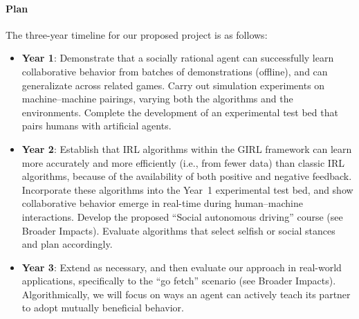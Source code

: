 
\vspace{\up}
\paragraph{Plan}

The three-year timeline for our proposed project is as follows:

\begin{itemize}
\item {\bf Year 1}: Demonstrate that a socially rational agent can
  successfully learn collaborative behavior from batches of
  demonstrations (offline), and can generalizate across related games.
  Carry out simulation experiments on machine--machine pairings,
  varying both the algorithms and the environments.  Complete the
  development of an experimental test bed that pairs humans with
  artificial agents.

\item {\bf Year 2}: Establish that IRL algorithms within the GIRL
  framework can learn more accurately and more efficiently (i.e., from
  fewer data) than classic IRL algorithms, because of the availability of
  both positive and negative feedback.
  Incorporate these algorithms into the Year~1 experimental
  test bed, and show collaborative behavior emerge in
  real-time during human--machine interactions.  Develop the proposed
  ``Social autonomous driving'' course (see Broader Impacts). Evaluate
  algorithms that select selfish or social stances and plan accordingly.

\item {\bf Year 3}: Extend as necessary, and then evaluate our
  approach in real-world applications, specifically to the ``go
  fetch'' scenario (see Broader Impacts).
   Algorithmically, we will focus on ways an agent can actively teach 
   its partner to adopt mutually beneficial behavior. 

\end{itemize}

